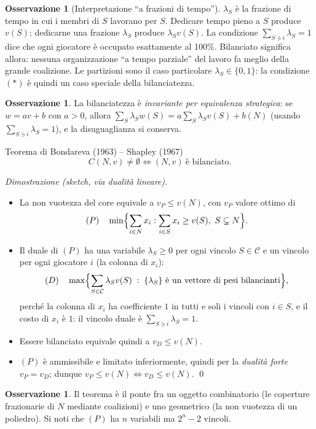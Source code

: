 \documentclass[12pt,a4paper,twoside]{book}
\theoremstyle{plain}
\theoremstyle{definition}
\newtheorem{remark}[theorem]{Osservazione}
\begin{document}
\begin{remark}[Interpretazione ``a frazioni di tempo'']
$\lambda_S$ è la frazione di tempo in cui i membri di $S$ lavorano per $S$.
Dedicare tempo pieno a $S$ produce $v(S)$; dedicarne una frazione $\lambda_S$
produce $\lambda_S v(S)$. La condizione $\sum_{S\ni i}\lambda_S=1$ dice che ogni
giocatore è occupato esattamente al 100\%. Bilanciato significa allora: nessuna
organizzazione ``a tempo parziale'' del lavoro fa meglio della grande coalizione.
Le partizioni sono il caso particolare $\lambda_S\in\{0,1\}$: la condizione $(*)$
è quindi un caso speciale della bilanciatezza.
\end{remark}

\begin{remark}
La bilanciatezza è \emph{invariante per equivalenza strategica}: se $w=av+b$ con
$a>0$, allora $\sum_S\lambda_S w(S)=a\sum_S\lambda_S v(S)+b(N)$ (usando
$\sum_{S\ni i}\lambda_S=1$), e la disuguaglianza si conserva.
\end{remark}

\begin{thmbox}{Teorema di Bondareva (1963) -- Shapley (1967)}
\[
  C(N,v)\ne\emptyset \iff (N,v)\ \text{è bilanciato.}
\]
\end{thmbox}

\textit{Dimostrazione (sketch, via dualità lineare).}
\begin{itemize}
  \item La non vuotezza del core equivale a $v_P\le v(N)$, con $v_P$ valore ottimo di
    \[
      (P)\quad \min\Bigl\{\sum_{i\in N}x_i:\sum_{i\in S}x_i\ge v(S),\ S\subsetneq N\Bigr\}.
    \]
  \item Il duale di $(P)$ ha una variabile $\lambda_S\ge 0$ per ogni vincolo
    $S\in\mathcal{C}$ e un vincolo per ogni giocatore $i$ (la colonna di $x_i$):
    \[
      (D)\quad \max\Bigl\{\sum_{S\in\mathcal{C}}\lambda_S v(S)\;:\;\{\lambda_S\}\ \text{è un vettore di pesi bilancianti}\Bigr\},
    \]
    perché la colonna di $x_i$ ha coefficiente $1$ in tutti e soli i vincoli con
    $i\in S$, e il costo di $x_i$ è $1$: il vincolo duale è
    $\sum_{S\ni i}\lambda_S= 1$.
  \item Essere bilanciato equivale quindi a $v_D\le v(N)$.
  \item $(P)$ è ammissibile e limitato inferiormente, quindi per la
    \emph{dualità forte} $v_P=v_D$; dunque $v_P\le v(N)\iff v_D\le v(N)$. \qed
\end{itemize}

\begin{remark}
Il teorema è il ponte fra un oggetto combinatorio (le coperture frazionarie di
$N$ mediante coalizioni) e uno geometrico (la non vuotezza di un poliedro). Si noti
che $(P)$ ha $n$ variabili ma $2^n-2$ vincoli.
\end{remark}
\end{document}

